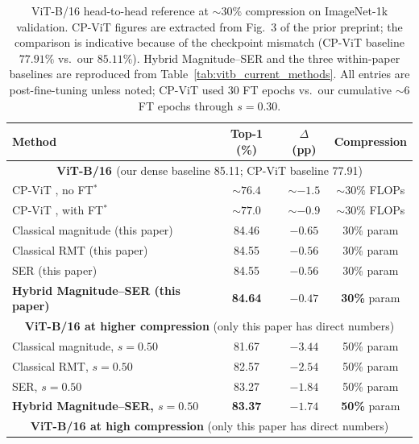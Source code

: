 \documentclass[11pt]{article}
\theoremstyle{plain}
\theoremstyle{definition}
\theoremstyle{remark}
\newcommand{\1}{\mathbf{1}}
\begin{document}
\begin{table}[ht]
\centering
\caption{ViT-B/16 head-to-head reference at \(\sim 30\%\) compression on ImageNet-1k validation.  CP-ViT figures are extracted from Fig.~3 of the prior preprint; the comparison is indicative because of the checkpoint mismatch (CP-ViT baseline \(77.91\%\) vs.\ our \(85.11\%\)).  Hybrid Magnitude--SER and the three within-paper baselines are reproduced from Table~\ref{tab:vitb_current_methods}.  All entries are post-fine-tuning unless noted; CP-ViT used \(30\) FT epochs vs.\ our cumulative \(\sim 6\) FT epochs through \(s=0.30\).}
\label{tab:vitb_prior_comparison}
\scriptsize
\setlength{\tabcolsep}{4pt}
\begin{tabular}{lccc}
\toprule
Method & Top-1 (\%) & \(\Delta\) (pp) & Compression \\
\midrule
\multicolumn{4}{c}{\textbf{ViT-B/16 \cite{dosovitskiy2021image}} (our dense baseline 85.11; CP-ViT baseline 77.91)} \\
CP-ViT \cite{song2022cp}, no FT$^\ast$        & \(\sim 76.4\) & \(\sim -1.5\) & \(\sim 30\%\) FLOPs \\
CP-ViT \cite{song2022cp}, with FT$^\ast$      & \(\sim 77.0\) & \(\sim -0.9\) & \(\sim 30\%\) FLOPs \\
Classical magnitude (this paper)              & 84.46 & \(-0.65\) & 30\% param \\
Classical RMT (this paper)                    & 84.55 & \(-0.56\) & 30\% param \\
SER (this paper)                              & 84.55 & \(-0.56\) & 30\% param \\
\textbf{Hybrid Magnitude--SER (this paper)}   & \textbf{84.64} & \(\boldsymbol{-0.47}\) & \textbf{30\%} param \\
\midrule
\multicolumn{4}{c}{\textbf{ViT-B/16 at higher compression} (only this paper has direct numbers)} \\
Classical magnitude, \(s=0.50\)               & 81.67 & \(-3.44\) & 50\% param \\
Classical RMT, \(s=0.50\)                     & 82.57 & \(-2.54\) & 50\% param \\
SER, \(s=0.50\)                               & 83.27 & \(-1.84\) & 50\% param \\
\textbf{Hybrid Magnitude--SER, \(s=0.50\)}    & \textbf{83.37} & \(\boldsymbol{-1.74}\) & \textbf{50\%} param \\
\midrule
\multicolumn{4}{c}{\textbf{ViT-B/16 at high compression} (only this paper has direct numbers)} \\

\end{tabular}
\end{table}
\end{document}
